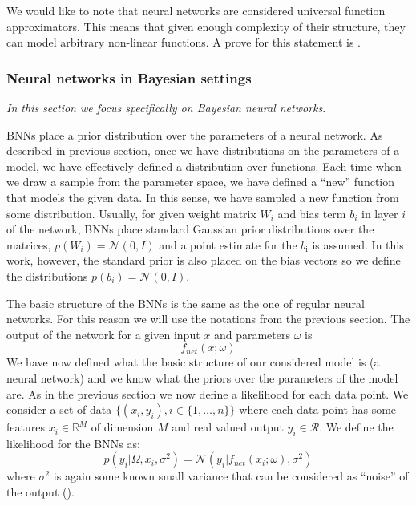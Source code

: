\documentclass[12pt,a4paper,twoside]{scrartcl}
\numberwithin{equation}{section}
\begin{document}
We would like to note that neural networks are considered universal function approximators. This means that given enough complexity of their structure, they can model arbitrary non-linear functions. A prove for this statement is \cite{hornik1989}.
\subsubsection{Neural networks in Bayesian settings}\label{sec:nn-in-bayesian}
\noindent\emph{In this section we focus specifically on Bayesian neural networks}.

BNNs place a prior distribution over the parameters of a neural network. As described in previous section, once we have distributions on the parameters of a model, we have effectively defined a distribution over functions. Each time when we draw a sample from the parameter space, we have defined a ``new'' function that models the given data. In this sense, we have sampled a new function from some distribution. Usually, for given weight matrix \(W_i\) and bias term \(b_i\) in layer \(i\) of the network, BNNs place standard Gaussian prior distributions over the matrices, \(p(W_i)=\mathcal{N}(0,I)\) and a point estimate for the \(b_{\text{i}}\) is assumed. In this work, however, the standard prior is also placed on the bias vectors so we define the distributions \(p(b_i)=\mathcal{N}(0,I)\).

The basic structure of the BNNs is the same as the one of regular neural networks. For this reason we will use the notations from the previous section. The output of the network for a given input \(x\) and parameters \(\omega\) is
\begin{equation}
   f_{net}(x;\omega)
\end{equation}
We have now defined what the basic structure of our considered model is (a neural network) and we know what the priors over the parameters of the model are. As in the previous section we now define a likelihood for each data point. We consider a set of data \(\{(x_i, y_i), i\in\{1,\ldots ,n\} \}\) where each data point has some features \(x_i\in\mathbb{R}^M\) of dimension \(M\) and real valued output \(y_i\in\mathcal{R}\). We define the likelihood for the BNNs as:
\begin{equation}
  p(y_i|\Omega, x_i, \sigma^2) = \mathcal{N}(y_i |f_{net}(x_i;\omega), \sigma^2)
\end{equation}
where \(\sigma^{\text{2}}\) is again some known small variance that can be considered as ``noise'' of the output (\cite{gal2016}).
\end{document}
